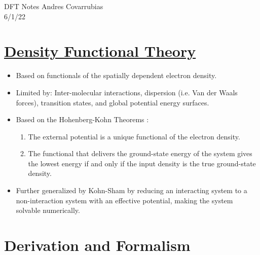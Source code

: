 \documentclass[12pt]{article}
\begin{document}
\noindent DFT Notes \hfill Andres Covarrubias    \\
6/1/22

\hrulefill
\section*{\href{https://en.wikipedia.org/wiki/Density_functional_theory}{Density Functional Theory}} %
\begin{itemize}
    \item Based on functionals of the spatially dependent electron density.
    \item Limited by: Inter-molecular interactions, dispersion (i.e. Van der Waals forces), transition states, and global potential energy surfaces. 
    \item Based on the Hohenberg-Kohn Theorems \cite{HKt1}:
    \begin{enumerate}
        \item The external potential is a unique functional of the electron density.
        \item The functional that delivers the ground-state energy of the system gives the lowest energy if and only if the input density is the true ground-state density.
    \end{enumerate}
    \item Further generalized by Kohn-Sham \cite{KSeq} by reducing an interacting system to a non-interaction system with an effective potential, making the system solvable numerically. 
\end{itemize}

\section{Derivation and Formalism} %
\end{document}
